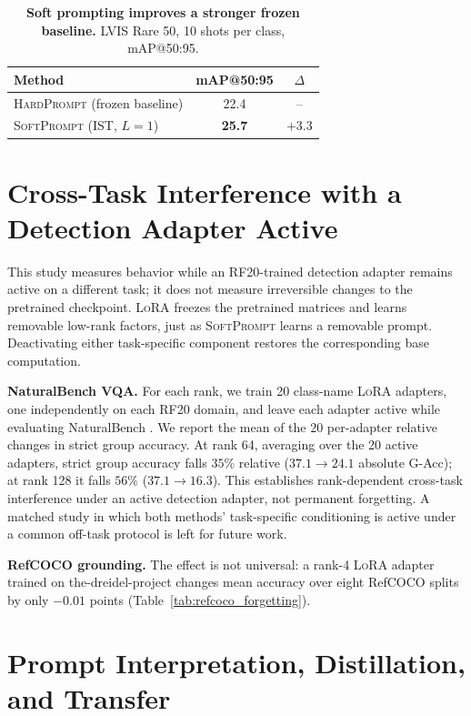 \documentclass{article}
\newcommand{\ours}{\textsc{SoftPrompt}}
\newcommand{\lora}{\textsc{LoRA}}
\newcommand{\hard}{\textsc{HardPrompt}}
\newcommand{\best}[1]{\textbf{#1}}
\begin{document}
\begin{table}[h]
  \centering
  \caption{\textbf{Soft prompting improves a stronger frozen baseline.}
  LVIS Rare 50, 10 shots per class, mAP@50:95.}
  \label{tab:lvis_rare50}
  \small
  \begin{tabular}{lcc}
    \toprule
    Method & mAP@50:95 & $\Delta$ \\
    \midrule
    \hard{} (frozen baseline) & 22.4 & -- \\
    \ours{} (IST, $L=1$) & \best{25.7} & $+3.3$ \\
    \bottomrule
  \end{tabular}
\end{table}

\section{Cross-Task Interference with a Detection Adapter Active}
\label{app:cross_task}
\label{subsec:forgetting}

This study measures behavior while an RF20-trained detection adapter remains
active on a different task; it does not measure irreversible changes to the
pretrained checkpoint.
\lora{} freezes the pretrained matrices and learns removable low-rank factors,
just as \ours{} learns a removable prompt.
Deactivating either task-specific component restores the corresponding base
computation.

\textbf{NaturalBench VQA.}
For each rank, we train 20 class-name \lora{} adapters, one independently on
each RF20 domain, and leave each adapter active while evaluating NaturalBench
\citep{LiNaturalBench:Samples}.
We report the mean of the 20 per-adapter relative changes in strict group
accuracy.
At rank 64, averaging over the 20 active adapters, strict group accuracy falls
$35\%$ relative ($37.1\!\rightarrow\!24.1$ absolute G-Acc); at rank 128 it
falls $56\%$ ($37.1\!\rightarrow\!16.3$).
This establishes rank-dependent cross-task interference under an active
detection adapter, not permanent forgetting.
A matched study in which both methods' task-specific conditioning is active
under a common off-task protocol is left for future work.

\textbf{RefCOCO grounding.}
The effect is not universal: a rank-4 \lora{} adapter trained on
the-dreidel-project changes mean accuracy over eight RefCOCO splits by only
$-0.01$ points (Table~\ref{tab:refcoco_forgetting}).

\section{Prompt Interpretation, Distillation, and Transfer}
\label{app:analysis}
\label{sec:analysis}
\end{document}
